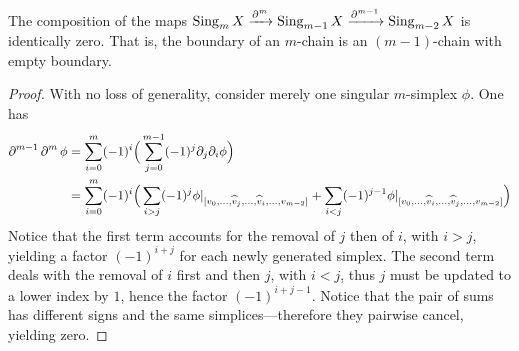 \begin{proposition}
\label{prop:boundary-squared-is-zero}
The composition of the maps
\(\operatorname{Sing}_m X \xrightarrow{\operatorname{\partial}^m} \operatorname{Sing}_{m-1} X \xrightarrow{\operatorname{\partial}^{m-1}}
\operatorname{Sing}_{m-2} X\) is identically zero. That is, the boundary of an \(m\)-chain is
an \((m-1)\)-chain with empty boundary.
\end{proposition}

\begin{proof}
With no loss of generality, consider merely one singular \(m\)-simplex
\(\phi\). One has
\begin{align*}
  \operatorname{\partial}^{m-1} \operatorname{\partial}^m \phi
  &= \sum_{i=0}^m (-1)^i
  \Big( \sum_{j=0}^{m-1} (-1)^j \partial_j \partial_i \phi \Big) \\
  &= \sum_{i=0}^m (-1)^i
  \Big(
    \sum_{i > j} (-1)^j
    \phi|_{[v_0, \dots, \widehat v_j, \dots, \widehat v_i, \dots, v_{m-2}]}
  + \sum_{i < j} (-1)^{j-1}
      \phi|_{[v_0, \dots, \widehat v_i, \dots, \widehat v_j, \dots, v_{m-2}]}
      \Big) \\
\end{align*}
Notice that the first term accounts for the removal of \(j\) then of \(i\), with
\(i > j\), yielding a factor \((-1)^{i + j}\) for each newly generated
simplex. The second term deals with the removal of \(i\) first and then \(j\),
with \(i < j\), thus \(j\) must be updated to a lower index by \(1\), hence the
factor \((-1)^{i + j - 1}\). Notice that the pair of sums has different signs
and the same simplices---therefore they pairwise cancel, yielding zero.
\end{proof}






